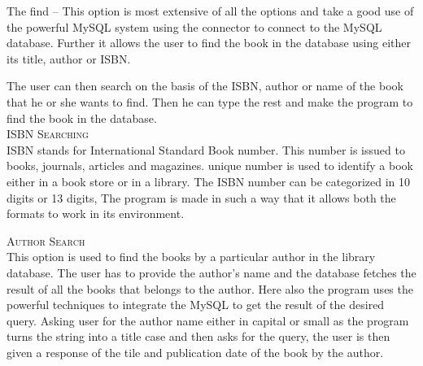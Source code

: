 \documentclass[12pt, a4paper, titlepage, openany]{report}
\begin{document}
The find -- This option is most extensive of all the options and take a good use of the powerful MySQL system using the connector to connect to the MySQL database. Further it allows the user to find the book in the database using either its title, author or ISBN. 


The user can then search on the basis of the ISBN, author or name of the book that he or she wants to find. Then he can type the rest and make the program to find the book in the database.
\\


\textsc{ISBN Searching} \\
ISBN stands for International Standard Book number. This number is issued to books, journals, articles and magazines. unique number is used to identify a book either in a book store or in a library. The ISBN number can be categorized in 10 digits or 13 digits, The program is made in such a way that it allows both the formats to work in its environment.  

\textsc{Author Search}\\
This option is used to find the books by a particular author in the library database. The user has to provide the author's name and the database fetches the result of all the books that belongs to the author. Here also the program uses the powerful techniques to integrate the MySQL to get the result of the desired query. Asking user for the author name either in capital or small as the program turns the string into a title case and then asks for the query, the user is then given a response of the tile and publication date of the book by the author.
\end{document}

